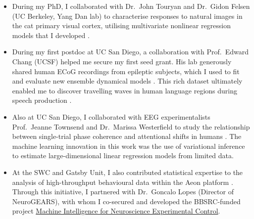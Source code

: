 \documentclass{article}
\begin{document}
\begin{itemize}

    \item During my PhD, I collaborated with Dr.~John Touryan and Dr.~Gidon
        Felsen (UC Berkeley, Yang Dan lab) to characterise responses to natural
        images in the cat primary visual cortex, utilising multivariate
        nonlinear regression models that I developed
        \citep{rapelaEtAl06,rapelaEtAl10}.

    \item During my first postdoc at UC San Diego, a collaboration with
        Prof.~Edward Chang (UCSF) helped me secure my first seed grant. His lab
        generously shared human ECoG recordings from epileptic subjects, which
        I used to fit and evaluate new ensemble dynamical models
        \citep{rapelaEtAlInPrepEDMs}. This rich dataset ultimately enabled me
        to discover travelling waves in human language regions during speech
        production
        \citep{rapelaInPrepTWsInSpeech,rapelaInPrepSyncTWs,rapelaInPrepSyncTWsII}.

    \item Also at UC San Diego, I collaborated with EEG experimentalists
        Prof.~Jeanne Townsend and Dr.~Marissa Westerfield to study the
        relationship between single-trial phase coherence and attentional
        shifts in humans \citep{rapelaEtAl18-avshift}. The machine learning
        innovation in this work was the use of variational inference to
        estimate large-dimensional linear regression models from limited data.


    \item At the SWC and Gatsby Unit, I also contributed statistical expertise
        to the analysis of high-throughput behavioural data within the Aeon
        platform \citep{campagnerEtAl25b}. Through this initiative, I partnered
        with Dr.~Goncalo Lopes (Director of NeuroGEARS), with whom I co-secured
        and developed the BBSRC-funded project
        \href{https://gtr.ukri.org/projects?ref=BB\%2FW019132\%2F1}{Machine
        Intelligence for Neuroscience Experimental Control}.

\end{itemize}
\end{document}
